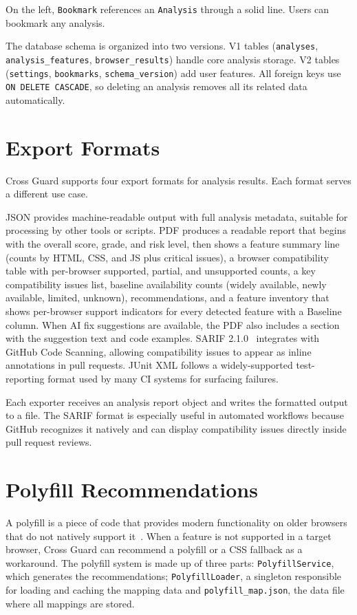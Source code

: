 On the left, \texttt{Bookmark} references an \texttt{Analysis} through a solid line. Users can bookmark any analysis.

The database schema is organized into two versions. V1 tables (\texttt{analyses}, \texttt{analysis\_features}, \texttt{browser\_results}) handle core analysis storage. V2 tables (\texttt{settings}, \texttt{bookmarks}, \texttt{schema\_version}) add user features. All foreign keys use \texttt{ON DELETE CASCADE}, so deleting an analysis removes all its related data automatically.

\section{Export Formats}
\label{sec:export}

Cross Guard supports four export formats for analysis results. Each format serves a different use case.

JSON provides machine-readable output with full analysis metadata, suitable for processing by other tools or scripts. PDF produces a readable report that begins with the overall score, grade, and risk level, then shows a feature summary line (counts by HTML, CSS, and JS plus critical issues), a browser compatibility table with per-browser supported, partial, and unsupported counts, a key compatibility issues list, baseline availability counts (widely available, newly available, limited, unknown), recommendations, and a feature inventory that shows per-browser support indicators for every detected feature with a Baseline column. When AI fix suggestions are available, the PDF also includes a section with the suggestion text and code examples. SARIF 2.1.0~\cite{sarif210} integrates with GitHub Code Scanning, allowing compatibility issues to appear as inline annotations in pull requests. JUnit XML follows a widely-supported test-reporting format used by many CI systems for surfacing failures.

Each exporter receives an analysis report object and writes the formatted output to a file. The SARIF format is especially useful in automated workflows because GitHub recognizes it natively and can display compatibility issues directly inside pull request reviews.

\section{Polyfill Recommendations}
\label{sec:polyfill}

A polyfill is a piece of code that provides modern functionality on older browsers that do not natively support it~\cite{sharp2010polyfill}. When a feature is not supported in a target browser, Cross Guard can recommend a polyfill or a CSS fallback as a workaround. The polyfill system is made up of three parts: \texttt{PolyfillService}, which generates the recommendations; \texttt{PolyfillLoader}, a singleton responsible for loading and caching the mapping data and \texttt{polyfill\_map.json}, the data file where all mappings are stored.

